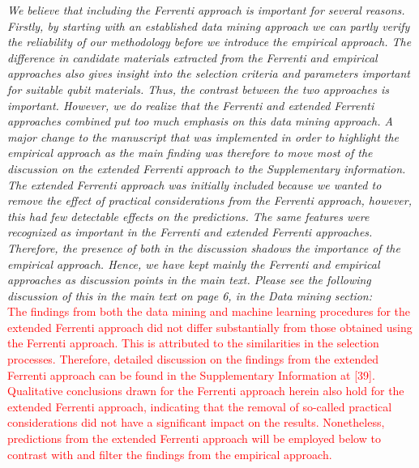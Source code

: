 \documentclass[11pt, a4paper]{letter} %
\newcommand{\mrk}[1]{\textcolor{red}{#1}}
\begin{document}
\textit{We  believe that including the Ferrenti approach is important for several reasons.  Firstly, by starting with an established data mining approach we can partly verify the reliability of our methodology before we introduce the empirical approach. The difference in candidate materials extracted from the Ferrenti and empirical approaches also gives insight into the selection criteria and parameters important for suitable qubit materials. Thus, the contrast between the two approaches is important. However, we do realize that the Ferrenti and extended Ferrenti approaches combined put too much emphasis on this data mining approach. A major change to the manuscript that was implemented in order to highlight the empirical approach as the main finding was therefore to move most of the discussion on the extended Ferrenti approach to the Supplementary information. 
The extended Ferrenti approach was initially included because we wanted to remove the effect of practical considerations from the Ferrenti approach, however, this had few detectable effects on the predictions. The same features were recognized as important in the Ferrenti and extended Ferrenti approaches. 
Therefore, the presence of both in the discussion shadows the importance of the empirical approach.
Hence, we have kept mainly the Ferrenti and empirical approaches as discussion points in the main text. Please see the following discussion of this in the main text on page 6, in the Data mining section:} \\ 
\mrk{The findings from both the data mining and machine learning procedures for the extended Ferrenti approach did not differ substantially from those obtained using the Ferrenti approach. This is attributed to the similarities in the selection processes. Therefore, detailed discussion on the findings from the extended Ferrenti approach can be found in the Supplementary Information at [39]. Qualitative conclusions drawn for the Ferrenti approach herein also hold for the extended Ferrenti approach, indicating that the removal of so-called practical considerations did not have a
significant impact on the results. Nonetheless, predictions from the extended Ferrenti approach will be employed below to contrast with and filter the findings from the empirical approach.} 
\end{document}
